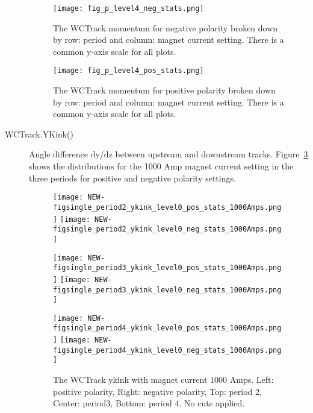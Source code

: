 \begin{description}
{}


 
 
 
 
 \begin{figure}
   \centering   
 \texttt{[image: fig\_p\_level4\_neg\_stats.png]}
 \caption[short]{The WCTrack momentum for negative polarity broken down by row: period and column: magnet current setting. There is a common y-axis scale for all plots.}
 \label{fig:p12_neg}
  \end{figure}
 
 
  \begin{figure}
    \centering   
 \texttt{[image: fig\_p\_level4\_pos\_stats.png]}
 \caption[short]{The WCTrack momentum for positive polarity broken down by row: period and column: magnet current setting. There is a common y-axis scale for all plots.}
 \label{fig:p12_pos}
  \end{figure}
  
  
  
  \item[WCTrack.YKink()] {  Angle difference dy/dz  between upstream and downstream tracks. Figure~\ref{fig_ykink} shows the  distributions for the 1000 Amp magnet current setting in the three periods for positive and negative polarity settings.
    \begin{figure}[h]
      \centering   
       	\texttt{[image: NEW-figsingle\_period2\_ykink\_level0\_pos\_stats\_1000Amps.png]}
	 \texttt{[image: NEW-figsingle\_period2\_ykink\_level0\_neg\_stats\_1000Amps.png]}
	 
   	\texttt{[image: NEW-figsingle\_period3\_ykink\_level0\_pos\_stats\_1000Amps.png]}
	 \texttt{[image: NEW-figsingle\_period3\_ykink\_level0\_neg\_stats\_1000Amps.png]}
	 
 	\texttt{[image: NEW-figsingle\_period4\_ykink\_level0\_pos\_stats\_1000Amps.png]}
	 \texttt{[image: NEW-figsingle\_period4\_ykink\_level0\_neg\_stats\_1000Amps.png]}
   \caption[short]{The WCTrack ykink with magnet current 1000 Amps. Left: positive polarity, Right: negative polarity, Top: period 2, Center: period3,  Bottom: period 4. No cuts applied.}
   \label{fig_ykink}
  \end{figure}
  }
  

\end{description}
